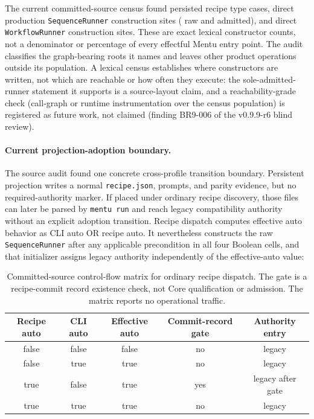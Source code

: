 \documentclass[11pt]{article}
\newcommand{\code}[1]{\texttt{#1}}
\begin{document}
The current committed-source census found \CurrentRecipeTypeCount{} persisted
recipe type cases, \CurrentSequenceRunnerConstructorCount{} direct production
\code{SequenceRunner} construction sites
(\CurrentLegacyRunnerConstructorCount{} raw and
\CurrentAdmittedRunnerConstructorCount{} admitted), and
\CurrentWorkflowRunnerConstructorCount{} direct \code{WorkflowRunner}
construction sites. These are exact lexical constructor counts, not a
denominator or percentage of every effectful Mentu entry point. The audit
classifies the graph-bearing roots it names and leaves other product operations
outside its population. A lexical census establishes where constructors are
written, not which are reachable or how often they execute: the
sole-admitted-runner statement it supports is a source-layout claim, and a
reachability-grade check (call-graph or runtime instrumentation over the
census population) is registered as future work, not claimed (finding
BR9-006 of the v0.9.9-r6 blind review).

\paragraph{Current projection-adoption boundary.}
The source audit found one concrete cross-profile transition boundary.
Persistent projection
writes a normal \code{recipe.json}, prompts, and parity evidence, but no
required-authority marker. If placed under ordinary recipe discovery, those
files can later be parsed by \code{mentu run} and reach legacy compatibility
authority without an explicit adoption transition. Recipe dispatch computes
effective auto behavior as CLI auto OR recipe auto. It nevertheless constructs
the raw \code{SequenceRunner} after any applicable precondition in all four
Boolean cells, and that initializer assigns legacy authority independently of
the effective-auto value:

\begin{table}[t]
\centering
\small
\begin{tabular}{@{}ccccc@{}}
\toprule
Recipe auto & CLI auto & Effective auto & Commit-record gate & Authority entry \\
\midrule
false & false & false & no  & legacy \\
false & true  & true  & no  & legacy \\
true  & false & true  & yes & legacy after gate \\
true  & true  & true  & no  & legacy \\
\bottomrule
\end{tabular}
\caption{Committed-source control-flow matrix for ordinary recipe dispatch.
The gate is a recipe-commit record existence check, not Core qualification or
admission. The matrix reports no operational traffic.}
\label{tab:recipe-dispatch-authority-matrix}
\end{table}
\end{document}
